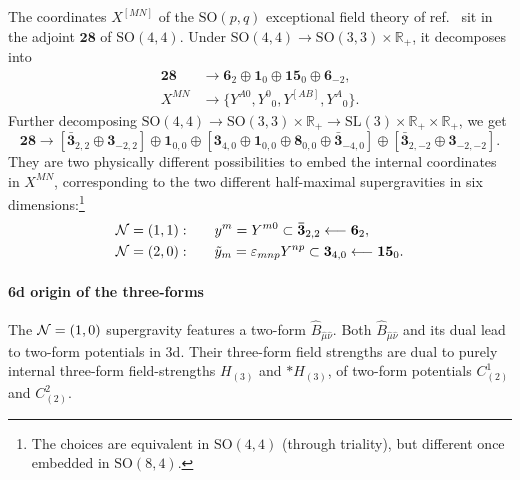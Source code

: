 \documentclass[11pt]{article}
\newcommand{\SO}{\ensuremath{\mathrm{SO}}\xspace}
\newcommand{\SL}{\ensuremath{\mathrm{SL}}\xspace}
\newcommand{\R}{\ensuremath{\mathbb{R}}\xspace}
\begin{document}
The coordinates $X^{[MN]}$ of the $\SO(p,q)$ exceptional field theory of ref.~\cite{Hohm:2017wtr} sit in the adjoint $\bm{28}$ of $\SO(4,4)$. Under $\SO(4,4)\rightarrow\SO(3,3)\times\R_{+}$, it decomposes into
\begin{equation}  
  \begin{aligned}
    \bm{28} &\longrightarrow \bm{6}_{2} \oplus \bm{1}_{0} \oplus \bm{15}_{0} \oplus \bm{6}_{-2},\\
    X^{MN} &\longrightarrow \{Y^{A0},Y^{0}{}_{0},Y^{[AB]},Y^{A}{}_{0}\}.
  \end{aligned}
\end{equation}
Further decomposing $\SO(4,4)\rightarrow\SO(3,3)\times\R_{+}\rightarrow\SL(3)\times\R_{+}\times\R_{+}$, we get
\begin{equation}  \label{eq:decomp28SO8}
  \bm{28} \longrightarrow \left[\bm{\bar{3}}_{2,2} \oplus \bm{3}_{-2,2}\right] \oplus \bm{1}_{0,0} \oplus \left[\bm{3}_{4,0} \oplus \bm{1}_{0,0} \oplus \bm{8}_{0,0} \oplus \bm{\bar{3}}_{-4,0}\right] \oplus \left[\bm{\bar{3}}_{2,-2} \oplus \bm{3}_{-2,-2}\right].
\end{equation}
They are two physically different possibilities to embed the internal coordinates in $X^{MN}$, corresponding to the two different half-maximal supergravities in six dimensions:\footnote{The choices are equivalent in $\SO(4,4)$ (through triality), but different once embedded in $\SO(8,4)$.}
\begin{equation}  \label{eq:coordSO8}
  \begin{aligned}
    {\cal N}=(1,1):&\qquad y^{m}=Y^{m0}\subset\bm{\bar{3}}_{2,2} \longleftarrow \bm{6}_{2},\\
    {\cal N}=(2,0):&\qquad \tilde{y}_{m}=\varepsilon_{mnp}Y^{np}\subset\bm{3}_{4,0}\longleftarrow\bm{15}_{0}.
  \end{aligned}
\end{equation}

\paragraph{6d origin of the three-forms} The ${\cal N}=(1,0)$ supergravity features a two-form $\hat{B}_{\hat\mu\hat\nu}$. Both $\hat{B}_{\hat\mu\hat\nu}$ and its dual lead to two-form potentials in 3d. Their three-form field strengths are dual to purely internal three-form field-strengths $H_{(3)}$ and $*H_{(3)}$, of two-form potentials $C_{(2)}^{1}$ and $C_{(2)}^{2}$.
\end{document}
